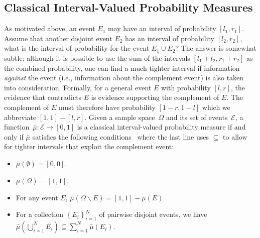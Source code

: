 \documentclass{article}
\theoremstyle{remark}
\newcommand{\events}{\ensuremath{\mathcal{E}}}
\begin{document}
\subsection{Classical Interval-Valued Probability Measures}

As motivated above, an event $E_{1}$ may have an interval of
probability $[l_{1},r_{1}]$. Assume that another disjoint event
$E_{2}$ has an interval of probability $[l_{2},r_{2}]$, what is the
interval of probability for the event $E_{1}\cup E_{2}$? The answer is
somewhat subtle: although it is possible to use the sum of the
intervals $[l_{1}+l_{2},r_{1}+r_{2}]$ as the combined probability, one
can find a much tighter interval if information \emph{against} the
event (i.e., information about the complement event) is also taken
into consideration. Formally, for a general event $E$ with probability
$[l,r]$, the evidence that contradicts $E$ is evidence supporting the
complement of $E$.  The complement of $E$ must therefore have
probability $\left[1-r,1-l\right]$ which we abbreviate
$\left[1,1\right]-\left[l,r\right]$.  Given a sample space~$\Omega$
and its set of events~$\events$, a
function~$\bar{\mu}:\events\rightarrow[0,1]$ is a classical
interval-valued probability measure if and only if $\bar{\mu}$
satisfies the following conditions~\cite{JamisonLodwick2004} where the
last line uses $\subseteq$ to allow for tighter intervals that exploit
the complement event:
\begin{itemize}
\item $\bar{\mu}(\emptyset)=[0,0]$.
\item $\bar{\mu}(\Omega)=[1,1]$. 
\item For any event $E$,
  $\bar{\mu}\left(\Omega\backslash E\right)=\left[1,1\right]-\bar{\mu}\left(E\right)$
\item For a collection $\left\{ E_{i}\right\} _{i=1}^{N}$ of pairwise
  disjoint events, we have
  $\bar{\mu}\left(\bigcup_{i=1}^{N}E_{i}\right)\subseteq\sum_{i=1}^{N}\bar{\mu}\left(E_{i}\right)$.
\end{itemize}
\end{document}
